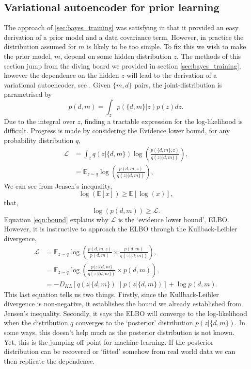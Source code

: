 \documentclass[12pt]{article}
\begin{document}
\subsection{Variational autoencoder for prior learning}\label{sec:vae_prior}
The approach of \ref{sec:bayes_training} was satisfying in that it provided an easy derivation of a prior model and a data covariance term. However, in practice the distribution assumed for $m$ is likely to be too simple. To fix this we wish to make the prior model, $m$, depend on some hidden distribution $z$. The methods of this section jump from the diving board we provided in section \ref{sec:bayes_training}, however the dependence on the hidden $z$ will lead to the derivation of a variational autoencoder, see \cite{vae}. Given $\{m,d\}$ pairs, the joint-distribution is parametrised by
\begin{equation}
p(d, m)=\int_{z}p(\{d, m\}|z)p(z) dz.
\end{equation}
Due to the integral over $z$, finding a tractable expression for the log-likelihood is difficult. Progress is made by considering the Evidence lower bound, for any probability distribution $q$,
\begin{align}
\mathcal{L}&=\int_{z} q(z | \{d, m\}) \log{\left(\frac{p(\{d, m\},z)}{q(z | \{d, m\})}\right)},\nonumber\\
&=\mathbb{E}_{z \sim q}\log {\left(\frac{p(d,m,z)}{q(z | \{d, m\})}\right)},
\end{align}
We can see from Jensen's inequality,
\begin{equation}
\log(\mathbb{E}[x]) \ge \mathbb{E}[\log(x)],\nonumber
\end{equation}
that,
\begin{equation}
\log(p(d, m)) \ge \mathcal{L}.\label{eqn:bound}
\end{equation}
Equation \ref{eqn:bound} explains why $\mathcal{L}$ is the `evidence lower bound', ELBO. However, it is instructive to approach the ELBO through the Kullback-Leibler divergence, 
\begin{align}
\mathcal{L}&=\mathbb{E}_{z \sim q}\log {\left(\frac{p(d,m, z)}{p(d, m)} \times \frac{p(d,m)}{q(z | \{d, m\})}\right)},\nonumber\\
&=\mathbb{E}_{z \sim q}\log {\left(\frac{p(z  | \{d,m \}}{q(z | \{d, m\})} \times p(d,m)\right)},\nonumber\\
&=-D_{KL}[q(z | \{d, m\})\|p(z|\{d,m\})]+\log {p(d,m)}.
\end{align}
This last equation tells us two things. Firstly, since the Kullback-Leibler divergence is non-negative, it establishes the bound we already established from Jensen's inequality. Secondly, it says the ELBO will converge to the log-likelihood when the distribution $q$ converges to the `posterior' distribution $ p(z|\{d,m\})$. In some ways, this doesn't help much as the posterior distribution is not known. Yet, this is the jumping off point for machine learning. If the posterior distribution can be recovered or `fitted' somehow from real world data we can then replicate the dependence.
   
\end{document}
